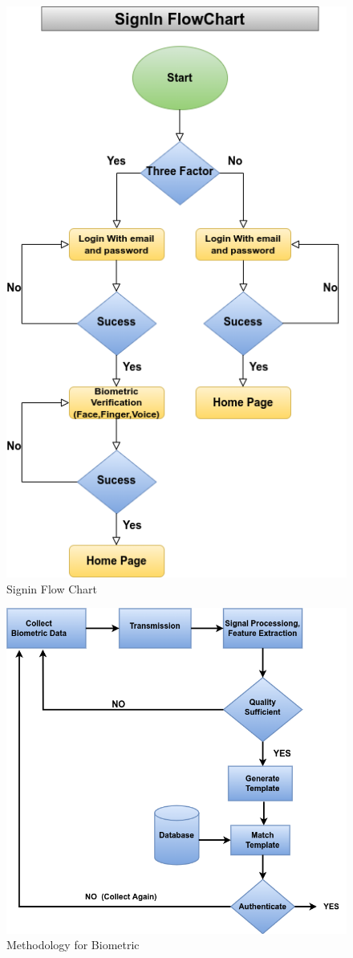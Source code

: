 \documentclass[conference]{IEEEtran}
\begin{document}
\begin{figure}[htbp]
	\centerline{\includegraphics[width=.8\columnwidth]{sigin.png}}
	\caption{Signin Flow Chart }
	\label{fig}
\end{figure}
\begin{figure}[htbp]
	\centerline{\includegraphics[width=1.0\columnwidth]{metho.png}}
	\caption{Methodology for Biometric }
	\label{fig}
\end{figure}
\end{document}
